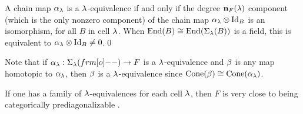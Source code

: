 \begin{lemma} \label{lem:lequivcriterion} A chain map $\alpha_\lambda$ is a $\lambda$-equivalence if and only if the degree ${\mathbf n}_F(\lambda)$ component (which is the only nonzero component) of the chain map $\alpha_\lambda \otimes \operatorname{Id}_B$ is an isomorphism, for all $B$ in cell $\lambda$. When $\operatorname{End}(B) \cong \operatorname{End}(\Sigma_\lambda(B))$ is a field, this is equivalent to $\alpha_\lambda \otimes \operatorname{Id}_B \ne 0$.\qed \end{lemma}

Note that if $\a_\l:\Sigma_\l(\one)\rightarrow F$ is a $\lambda$-equivalence and $\beta$ is any map homotopic to $\alpha_\lambda$, then $\beta$ is a $\lambda$-equivalence since $\operatorname{Cone}(\beta)\cong \operatorname{Cone}(\alpha_\lambda)$.



	


If one has a family of $\lambda$-equivalences for each cell $\lambda$, then $F$ is very close to being categorically prediagonalizable \cite[Definition 6.13]{ElHog17a}. 

